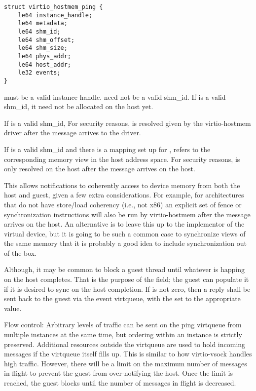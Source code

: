 \begin{lstlisting}
struct virtio_hostmem_ping {
    le64 instance_handle;
    le64 metadata;
    le64 shm_id;
    le64 shm_offset;
    le64 shm_size;
    le64 phys_addr;
    le64 host_addr;
    le32 events;
}
\end{lstlisting}

 must be a valid instance handle.
 need not be a valid shm_id.
If  is a valid shm_id,
it need not be allocated on the host yet.

If  is a valid shm_id,
For security reasons,
 is resolved given  by
the virtio-hostmem driver after the message arrives to the driver.

If  is a valid shm_id
and there is a mapping set up for ,
 refers to the corresponding memory view in the host address space.
For security reasons,
 is only resolved on the host after the message arrives on the host.

This allows notifications to coherently access to device memory
from both the host and guest, given a few extra considerations.
For example, for architectures that do not have store/load coherency (i.e., not x86)
an explicit set of fence or synchronization instructions will also be run by virtio-hostmem
after the message arrives on the host.
An alternative is to leave this up to the implementor of the virtual device,
but it is going to be such a common case to synchronize views of the same memory
that it is probably a good idea to include synchronization out of the box.

Although, it may be common to block a guest thread until whatever is happing on the host completes.
That is the purpose of the  field; the guest can populate it
if it is desired to sync on the host completion.
If  is not zero, then a reply shall be sent
back to the guest via the event virtqueue,
with the  set to the appropriate value.

Flow control: Arbitrary levels of traffic can be sent
on the ping virtqueue from multiple instances at the same time,
but ordering within an instance is strictly preserved.
Additional resources outside the virtqueue are used to hold incoming messages
if the virtqueue itself fills up.
This is similar to how virtio-vsock handles high traffic.
However, there will be a limit on the maximum number of messages in flight
to prevent the guest from over-notifying the host.
Once the limit is reached, the guest blocks until the number of messages in flight
is decreased.


